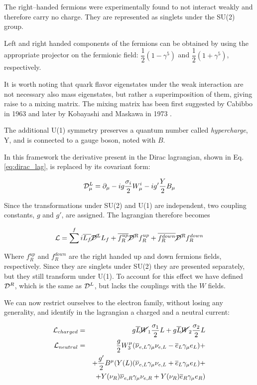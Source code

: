 The right--handed fermions were experimentally found to not interact weakly and therefore carry no charge. They are represented as singlets under the SU(2) group.

Left and right handed components of the fermions can be obtained by using the appropriate projector on the fermionic field: $\dfrac{1}{2}(1-\gamma^5)$ and $\dfrac{1}{2}(1+\gamma^5)$, respectively.

It is worth noting that quark flavor eigenstates under the weak interaction are not necessary also mass eigenstates, but rather a superimposition of them, giving raise to a mixing matrix. The mixing matrix has been first suggested by Cabibbo in 1963 \cite{Cabibbo:1963yz} and later by Kobayashi and Maskawa in 1973 \cite{Kobayashi:1973fv}.

The additional U(1) symmetry preserves a quantum number called \emph{hypercharge}, Y, and is connected to a gauge boson, noted with $B$. 

In this framework the derivative present in the Dirac lagrangian, shown in Eq. \ref{eq:dirac_lag}, is replaced by its covariant form:

\begin{equation}
\mathcal{D}^L_\mu = \partial_\mu - ig\dfrac{\sigma_i}{2}W^i_\mu - ig'\dfrac{Y}{2}B_\mu
\end{equation}

Since the transformations under SU(2) and U(1) are independent, two coupling constants, $g$ and $g'$, are assigned. The lagrangian therefore becomes

\begin{equation}
\mathcal{L} = \sum^f i \overline{L_f}\cancel{\mathcal{D}}^LL_f + \overline{f^{up}_R}\cancel{\mathcal{D}}^Rf^{up}_R  + \overline{f^{down}_R}\cancel{\mathcal{D}}^Rf^{down}_R 
\end{equation}

Where $f^{up}_R$ and $f^{down}_R$ are the right handed up and down fermions fields, respectively. Since they are singlets under SU(2) they are presented separately, but they still transform under U(1). To account for this effect we have defined $\mathcal{D}^R$, which is the same as $\mathcal{D}^L$, but lacks the couplings with the $W$ fields. 

We can now restrict ourselves to the electron family, without losing any generality, and identify in the lagrangian a charged and a neutral current:

\begin{eqnarray}
\mathcal{L}_{charged} &=& g \overline{L} \cancel{W}_1 \dfrac{\sigma_1}{2}L + g \overline{L} \cancel{W}_2 \dfrac{\sigma_2}{2}L \\ 
\mathcal{L}_{neutral} &=& \dfrac{g}{2} W_3^\mu (\overline{\nu}_{e,L}\gamma_\mu\nu_{e,L} - \overline{e}_L\gamma_\mu e_L) +  \nonumber \\
& & + \dfrac{g'}{2} B^\mu ( Y(L) ( \overline{\nu}_{e,L}\gamma_\mu\nu_{e,L} + \overline{e}_L\gamma_\mu e_L ) + \nonumber \\
& & + Y(\nu_R) \overline{\nu}_{e,R}\gamma_\mu\nu_{e,R} + Y(\nu_R)  \overline{e}_R\gamma_\mu e_R )
\end{eqnarray}

